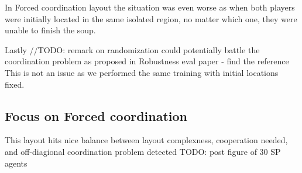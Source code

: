 In Forced coordination layout the situation was even worse as when both players were initially located in the same isolated region, no matter which one, they were unable to finish the soup.

Lastly //TODO: remark on randomization could potentially battle the coordination problem as proposed in Robustness eval paper - find the reference
This is not an issue as we performed the same training with initial locations fixed.

\subsection{Focus on Forced coordination}
This layout hits nice balance between layout complexness, cooperation needed, and off-diagional coordination problem detected
TODO: post figure of 30 SP agents